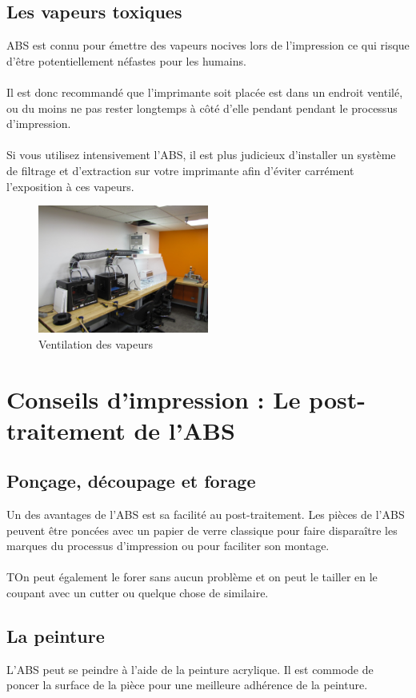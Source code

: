 \documentclass[11pt,a4paper]{article}
\begin{document}
	\subsection{Les vapeurs toxiques}ABS est connu pour émettre des vapeurs nocives lors de l’impression ce qui risque d’être potentiellement néfastes pour les humains. 
\\\\
Il est donc recommandé que l’imprimante soit placée est dans un endroit ventilé, ou du moins ne pas rester longtemps à côté d’elle pendant pendant le processus d’impression.
\\\\
Si vous utilisez intensivement l’ABS, il est plus judicieux d’installer un système de filtrage et d’extraction sur votre imprimante afin d’éviter carrément l’exposition à ces vapeurs.
\begin{figure}[H]
\centering
\includegraphics[width=0.5\textwidth,cfbox=azul_marcos 4pt 0pt]{FOTOS/VENTILACIONVAPORES}
\caption*{Ventilation des vapeurs}
\end{figure}
\section{Conseils d’impression : Le post-traitement de l’ABS}
	\subsection{Ponçage, découpage et forage}Un des avantages de l’ABS est sa facilité au post-traitement. Les pièces de l’ABS peuvent être poncées avec un papier de verre classique pour faire disparaître les marques du processus d’impression ou pour faciliter son montage.
\\\\
TOn peut également le forer sans aucun problème et on peut le tailler en le coupant avec un cutter ou quelque chose de similaire.
	\subsection{La peinture}L’ABS peut se peindre à l’aide de la peinture acrylique. Il est commode de poncer la surface de la pièce pour une meilleure adhérence de la peinture.
\end{document}
